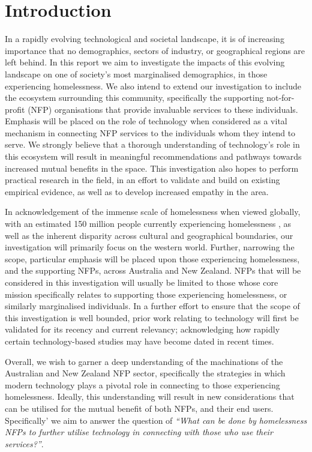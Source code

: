 \chapter{Introduction}

In a rapidly evolving technological and societal landscape, it is of increasing importance that no demographics, sectors of industry, or geographical regions are left behind. In this report we aim to investigate the impacts of this evolving landscape on one of society's most marginalised demographics, in those experiencing homelessness. We also intend to extend our investigation to include the ecosystem surrounding this community, specifically the supporting not-for-profit (NFP) organisations that provide invaluable services to these individuals. Emphasis will be placed on the role of technology when considered as a vital mechanism in connecting NFP services to the individuals whom they intend to serve. We strongly believe that a thorough understanding of technology's role in this ecosystem will result in meaningful recommendations and pathways towards increased mutual benefits in the space. This investigation also hopes to perform practical research in the field, in an effort to validate and build on existing empirical evidence, as well as to develop increased empathy in the area.

In acknowledgement of the immense scale of homelessness when viewed globally, with an estimated 150 million people currently experiencing homelessness \cite{chamie_2017}, as well as the inherent disparity across cultural and geographical boundaries, our investigation will primarily focus on the western world. Further, narrowing the scope, particular emphasis will be placed upon those experiencing homelessness, and the supporting NFPs, across Australia and New Zealand. NFPs that will be considered in this investigation will usually be limited to those whose core mission specifically relates to supporting those experiencing homelessness, or similarly marginalised individuals. In a further effort to ensure that the scope of this investigation is well bounded, prior work relating to technology will first be validated for its recency and current relevancy; acknowledging how rapidly certain technology-based studies may have become dated in recent times.

Overall, we wish to garner a deep understanding of the machinations of the Australian and New Zealand NFP sector, specifically the strategies in which modern technology plays a pivotal role in connecting to those experiencing homelessness. Ideally, this understanding will result in new considerations that can be utilised for the mutual benefit of both NFPs, and their end users. Specifically' we aim to answer the question of \emph{“What can be done by homelessness NFPs to further utilise technology in connecting with those who use their services?”}.

